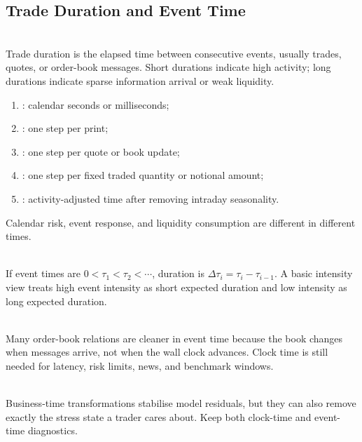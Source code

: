 \subsection{Trade Duration and Event Time}

\begin{definition} \\
Trade duration is the elapsed time between consecutive events, usually trades, quotes, or order-book messages. Short durations indicate high activity; long durations indicate sparse information arrival or weak liquidity.
\end{definition}

\begin{taxonomy} 
\begin{enumerate}[label=\roman*.]
\setlength{\itemsep}{0pt}
\item {}: calendar seconds or milliseconds;
\item {}: one step per print;
\item {}: one step per quote or book update;
\item {}: one step per fixed traded quantity or notional amount;
\item {}: activity-adjusted time after removing intraday seasonality.
\end{enumerate}
Calendar risk, event response, and liquidity consumption are different in different times.
\end{taxonomy}

\begin{model} \\
If event times are $0<\tau_1<\tau_2<\cdots$, duration is $\Delta \tau_i=\tau_i-\tau_{i-1}$. A basic intensity view treats high event intensity as short expected duration and low intensity as long expected duration.
\end{model}

\begin{principle} \\
Many order-book relations are cleaner in event time because the book changes when messages arrive, not when the wall clock advances. Clock time is still needed for latency, risk limits, news, and benchmark windows.
\end{principle}

\begin{caveat} \\
Business-time transformations stabilise model residuals, but they can also remove exactly the stress state a trader cares about. Keep both clock-time and event-time diagnostics.
\end{caveat}
